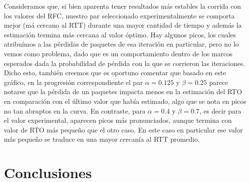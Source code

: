 \indent Consideramos que, si bien aparenta tener resultados más estables la corrida con los valores del RFC, nuestro par seleccionado experimentalmente se comporta mejor (má cercano al RTT) durante una mayor cantidad de tiempo y además la estimación termina más cercana al valor óptimo. Hay algunos picos, los cuales atribuímos a las pérdidas de paquetes de esa iteración en particular, pero no lo vemos como problema, dado que es un comportamiento dentro de los marcos esperados dada la probabilidad de pérdida con la que se corrieron las iteraciones. Dicho esto, también creemos que es oportuno comentar que basado en este gráfico, en la progresión correspondiente el par $\alpha = 0.125$ y $\beta=0.25$ parece notarse que la pérdida de un paquetes impacta menos en la estimación del RTO en comparación con el último valor que había estimado, algo que se nota en picos no tan abruptos en la curva. En contraste, para $\alpha = 0.4$ y $\beta = 0.7$, es decir para el valor experimental, aparecen picos más pronunciados, aunque termina con valor de RTO más pequeño que el otro caso. En este caso en particular ese valor más pequeño se traduce en una mayor cercanía al RTT promedio.\\


\section{Conclusiones}
